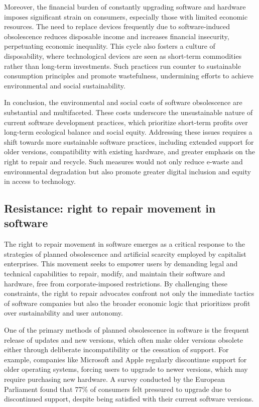 \begin{refsection}
Moreover, the financial burden of constantly upgrading software and hardware imposes significant strain on consumers, especially those with limited economic resources. The need to replace devices frequently due to software-induced obsolescence reduces disposable income and increases financial insecurity, perpetuating economic inequality. This cycle also fosters a culture of disposability, where technological devices are seen as short-term commodities rather than long-term investments. Such practices run counter to sustainable consumption principles and promote wastefulness, undermining efforts to achieve environmental and social sustainability.

In conclusion, the environmental and social costs of software obsolescence are substantial and multifaceted. These costs underscore the unsustainable nature of current software development practices, which prioritize short-term profits over long-term ecological balance and social equity. Addressing these issues requires a shift towards more sustainable software practices, including extended support for older versions, compatibility with existing hardware, and greater emphasis on the right to repair and recycle. Such measures would not only reduce e-waste and environmental degradation but also promote greater digital inclusion and equity in access to technology.

\subsection{Resistance: right to repair movement in software}

The right to repair movement in software emerges as a critical response to the strategies of planned obsolescence and artificial scarcity employed by capitalist enterprises. This movement seeks to empower users by demanding legal and technical capabilities to repair, modify, and maintain their software and hardware, free from corporate-imposed restrictions. By challenging these constraints, the right to repair advocates confront not only the immediate tactics of software companies but also the broader economic logic that prioritizes profit over sustainability and user autonomy.

One of the primary methods of planned obsolescence in software is the frequent release of updates and new versions, which often make older versions obsolete either through deliberate incompatibility or the cessation of support. For example, companies like Microsoft and Apple regularly discontinue support for older operating systems, forcing users to upgrade to newer versions, which may require purchasing new hardware. A survey conducted by the European Parliament found that 77\% of consumers felt pressured to upgrade due to discontinued support, despite being satisfied with their current software versions.


\end{refsection}
